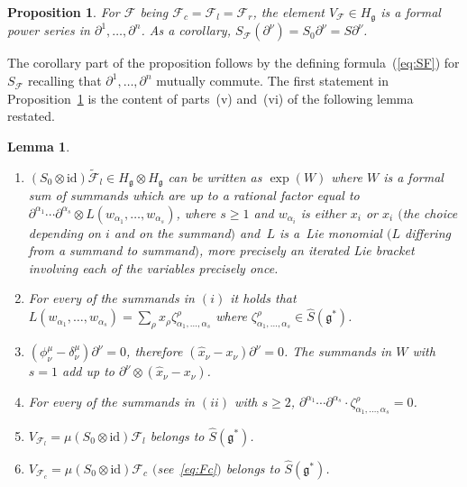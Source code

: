\documentclass[pdftex]{sigma}
\def\gg{\mathfrak{g}}
\def\id{\mathrm{id}}
\newtheorem{Lemma}[Theorem]{Lemma}
\newtheorem{Proposition}[Theorem]{Proposition}
 { \theoremstyle{definition}
\newtheorem{Definition}[Theorem]{Definition}
\newtheorem{Example}[Theorem]{Example}
\newtheorem{Remark}[Theorem]{Remark} }
\numberwithin{equation}{section}
\begin{document}
\begin{Proposition}\label{prop:Fpartial}
For $\mathcal{F}$ being $\mathcal{F}_c = \mathcal{F}_l = \mathcal{F}_r$, the element $V_{\mathcal{F}}\in H_\gg$ is a formal power series in $\partial^1,\dots,\partial^n$. As a corollary, $S_{\mathcal{F}}(\partial^\nu) = S_0 \partial^\nu = S \partial^\nu$.
\end{Proposition}
The corollary part of the proposition follows by the defining formula~(\ref{eq:SF}) for $S_{\mathcal{F}}$ recalling that $\partial^1,\dots,\partial^n$ mutually commute. The first statement in Proposition~\ref{prop:Fpartial} is the content of parts~(v) and~(vi) of the following lemma restated.
\begin{Lemma}\quad
\begin{enumerate}\itemsep=0pt
\item[$(i)$] $(S_0\otimes\id)\tilde{\mathcal{F}}_l\in H_\gg\otimes H_\gg$ can be written as $\exp(W)$ where $W$ is a formal sum of summands which are up to a rational factor equal to $\partial^{\alpha_1}\cdots\partial^{\alpha_s}\otimes L(w_{\alpha_1},\dots,w_{\alpha_s})$, where $s\geq 1$ and $w_{\alpha_i}$ is either $x_i$ or $\hat{x}_i$ $($the choice depending on $i$ and on the summand$)$ and~$L$ is a~Lie monomial $(L$ differing from a summand to summand$)$, more precisely an iterated Lie bracket involving each of the variables precisely once.

\item[$(ii)$] For every of the summands in $(i)$ it holds that $L(w_{\alpha_1},\dots,w_{\alpha_s}) = \sum_\rho x_\rho\zeta^{\rho}_{\alpha_1,\dots,\alpha_s}$ where $\zeta^{\rho}_{\alpha_1,\dots,\alpha_s}\in\hat{S}(\gg^*)$.

\item[$(iii)$] $(\phi^\mu_\nu-\delta^\mu_\nu)\partial^\nu=0$, therefore $(\hat{x}_\nu-x_\nu)\partial^\nu = 0$. The summands in $W$ with $s = 1$ add up to $\partial^\nu\otimes(\hat{x}_\nu-x_\nu)$.

\item[$(iv)$] For every of the summands in $(ii)$ with $s\geq 2$, $\partial^{\alpha_1}\cdots\partial^{\alpha_s}\cdot\zeta^{\rho}_{\alpha_1,\dots,\alpha_s} = 0$.

\item[$(v)$] $V_{\mathcal{F}_l} = \mu(S_0\otimes\id)\mathcal{F}_l$ belongs to $\hat{S}(\gg^*)$.

\item[$(vi)$] $V_{\mathcal{F}_c} = \mu(S_0\otimes\id)\mathcal{F}_c$ $($see~\eqref{eq:Fc}$)$ belongs to $\hat{S}(\gg^*)$.
\end{enumerate}
\end{Lemma}
\end{document}
